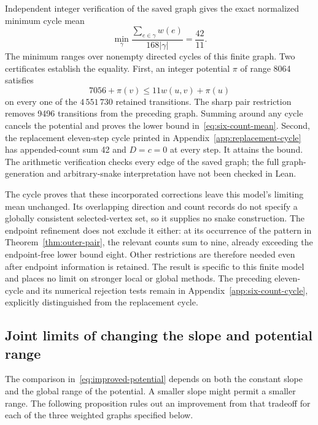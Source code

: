 \documentclass[11pt,a4paper]{article}
\theoremstyle{definition}
\theoremstyle{remark}
\begin{document}
Independent integer verification of the saved graph gives the exact normalized minimum cycle mean
\begin{equation}\label{eq:six-count-mean}
\min_{\gamma}\frac{\sum_{e\in\gamma}w(e)}{168|\gamma|}=\frac{42}{11}.
\end{equation}
The minimum ranges over nonempty directed cycles of this finite graph. Two certificates establish the equality. First, an integer potential $\pi$ of range 8064 satisfies
\[
7056+\pi(v)\le11w(u,v)+\pi(u)
\]
on every one of the $4\,551\,730$ retained transitions. The sharp pair restriction removes 9496 transitions from the preceding graph. Summing around any cycle cancels the potential and proves the lower bound in~\eqref{eq:six-count-mean}. Second, the replacement eleven-step cycle printed in Appendix~\ref{app:replacement-cycle} has appended-count sum 42 and $D=c=0$ at every step. It attains the bound. The arithmetic verification checks every edge of the saved graph; the full graph-generation and arbitrary-snake interpretation have not been checked in Lean.

The cycle proves that these incorporated corrections leave this model's limiting mean unchanged. Its overlapping direction and count records do not specify a globally consistent selected-vertex set, so it supplies no snake construction. The endpoint refinement does not exclude it either: at its occurrence of the pattern in Theorem~\ref{thm:outer-pair}, the relevant counts sum to nine, already exceeding the endpoint-free lower bound eight. Other restrictions are therefore needed even after endpoint information is retained. The result is specific to this finite model and places no limit on stronger local or global methods. The preceding eleven-cycle and its numerical rejection tests remain in Appendix~\ref{app:six-count-cycle}, explicitly distinguished from the replacement cycle.

\subsection{Joint limits of changing the slope and potential range}\label{sec:joint-optimality}
The comparison in~\eqref{eq:improved-potential} depends on both the constant
slope and the global range of the potential. A smaller slope might permit
a smaller range. The following proposition rules out an improvement from
that tradeoff for each of the three weighted graphs specified below.
\end{document}
